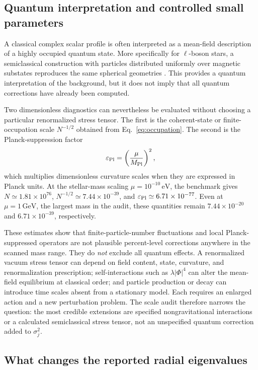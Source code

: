 \documentclass[aps,prd,preprint,onecolumn,nofootinbib,superscriptaddress,showkeys]{revtex4-2}
\begin{document}
\subsection{Quantum interpretation and controlled small parameters}

A classical complex scalar profile is often interpreted as a mean-field description of a highly occupied quantum state. More specifically for $\ell$-boson stars, a semiclassical construction with particles distributed uniformly over magnetic substates reproduces the same spherical geometries \cite{AlcubierreSemiclassical2023}. This provides a quantum interpretation of the background, but it does not imply that all quantum corrections have already been computed.

Two dimensionless diagnostics can nevertheless be evaluated without choosing a particular renormalized stress tensor. The first is the coherent-state or finite-occupation scale $N^{-1/2}$ obtained from Eq.~\eqref{eq:occupation}. The second is the Planck-suppression factor
\begin{equation}
 \varepsilon_{\rm Pl}=\left(\frac{\mu}{M_{\rm Pl}}\right)^2,
\label{eq:planck-suppression}
\end{equation}
which multiplies dimensionless curvature scales when they are expressed in Planck units. At the stellar-mass scaling $\mu=10^{-10}\,\mathrm{eV}$, the benchmark gives $N\simeq1.81\times10^{76}$, $N^{-1/2}\simeq7.44\times10^{-39}$, and $\varepsilon_{\rm Pl}\simeq6.71\times10^{-77}$. Even at $\mu=1\,\mathrm{GeV}$, the largest mass in the audit, these quantities remain $7.44\times10^{-20}$ and $6.71\times10^{-39}$, respectively.

These estimates show that finite-particle-number fluctuations and local Planck-suppressed operators are not plausible percent-level corrections anywhere in the scanned mass range. They do \emph{not} exclude all quantum effects. A renormalized vacuum stress tensor can depend on field content, state, curvature, and renormalization prescription; self-interactions such as $\lambda|\Phi|^4$ can alter the mean-field equilibrium at classical order; and particle production or decay can introduce time scales absent from a stationary model. Each requires an enlarged action and a new perturbation problem. The scale audit therefore narrows the question: the most credible extensions are specified nongravitational interactions or a calculated semiclassical stress tensor, not an unspecified quantum correction added to $\sigma_j^2$.

\subsection{What changes the reported radial eigenvalues}
\end{document}
